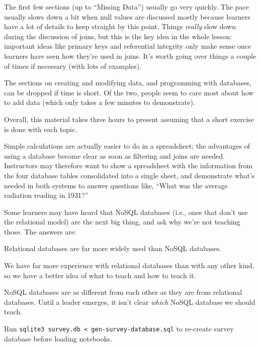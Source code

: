 \documentclass{book}
\begin{document}
\begin{swcitemize}
\item
  The first few sections (up to ``Missing Data'') usually go very
  quickly. The pace usually slows down a bit when null values are
  discussed mostly because learners have a lot of details to keep
  straight by this point. Things \emph{really} slow down during the
  discussion of joins, but this is the key idea in the whole lesson:
  important ideas like primary keys and referential integrity only make
  sense once learners have seen how they're used in joins. It's worth
  going over things a couple of times if necessary (with lots of
  examples).
\item
  The sections on creating and modifying data, and programming with
  databases, can be dropped if time is short. Of the two, people seem to
  care most about how to add data (which only takes a few minutes to
  demonstrate).
\item
  Overall, this material takes three hours to present assuming that a
  short exercise is done with each topic.
\item
  Simple calculations are actually easier to do in a spreadsheet; the
  advantages of using a database become clear as soon as filtering and
  joins are needed. Instructors may therefore want to show a spreadsheet
  with the information from the four database tables consolidated into a
  single sheet, and demonstrate what's needed in both systems to answer
  questions like, ``What was the average radiation reading in 1931?''
\item
  Some learners may have heard that NoSQL databases (i.e., ones that
  don't use the relational model) are the next big thing, and ask why
  we're not teaching those. The answers are:

  \begin{swcenumerate2}
  \item
    Relational databases are far more widely used than NoSQL databases.
  \item
    We have far more experience with relational databases than with any
    other kind, so we have a better idea of what to teach and how to
    teach it.
  \item
    NoSQL databases are as different from each other as they are from
    relational databases. Until a leader emerges, it isn't clear
    \emph{which} NoSQL database we should teach.
  \end{swcenumerate2}
\item
  Run \texttt{sqlite3 survey.db \textless{} gen-survey-database.sql} to
  re-create survey database before loading notebooks.
\end{swcitemize}
\end{document}
